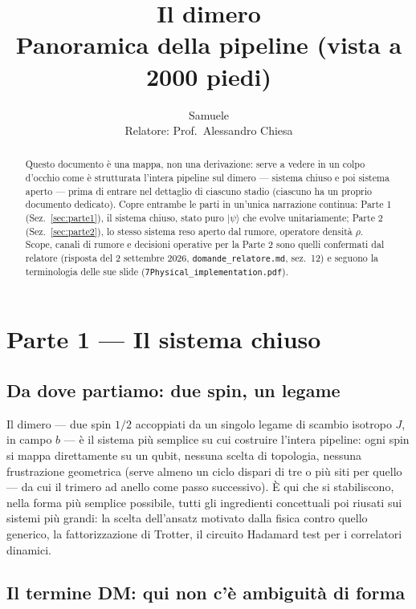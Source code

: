 \documentclass[11pt,a4paper]{article}
\title{Il dimero\\
\large Panoramica della pipeline (vista a 2000 piedi)}
\author{Samuele \\ Relatore: Prof.\ Alessandro Chiesa}
\date{}
\newcommand{\ket}[1]{\lvert #1 \rangle}
\begin{document}
\maketitle

\begin{abstract}
\noindent Questo documento è una mappa, non una derivazione: serve a
vedere in un colpo d'occhio come è strutturata l'intera pipeline sul
dimero --- sistema chiuso e poi sistema aperto --- prima di entrare nel
dettaglio di ciascuno stadio (ciascuno ha un proprio documento
dedicato). Copre entrambe le parti in un'unica narrazione continua:
Parte 1 (Sez.~\ref{sec:parte1}), il sistema chiuso, stato puro
$\ket\psi$ che evolve unitariamente; Parte 2 (Sez.~\ref{sec:parte2}),
lo stesso sistema reso aperto dal rumore, operatore densità $\rho$.
Scope, canali di rumore e decisioni operative per la Parte 2 sono
quelli confermati dal relatore (risposta del 2 settembre 2026,
\texttt{domande\_relatore.md}, sez.~12) e seguono la terminologia delle
sue slide (\texttt{7Physical\_implementation.pdf}).
\end{abstract}

\tableofcontents

\section{Parte 1 --- Il sistema chiuso}
\label{sec:parte1}

\subsection{Da dove partiamo: due spin, un legame}

Il dimero --- due spin $1/2$ accoppiati da un singolo legame di scambio
isotropo $J$, in campo $b$ --- è il sistema più semplice su cui costruire
l'intera pipeline: ogni spin si mappa direttamente su un qubit, nessuna
scelta di topologia, nessuna frustrazione geometrica (serve almeno un
ciclo dispari di tre o più siti per quello --- da cui il trimero ad
anello come passo successivo). È qui che si stabiliscono, nella forma
più semplice possibile, tutti gli ingredienti concettuali poi riusati
sui sistemi più grandi: la scelta dell'ansatz motivato dalla fisica
contro quello generico, la fattorizzazione di Trotter, il circuito
Hadamard test per i correlatori dinamici.

\subsection{Il termine DM: qui non c'è ambiguità di forma}
\end{document}
